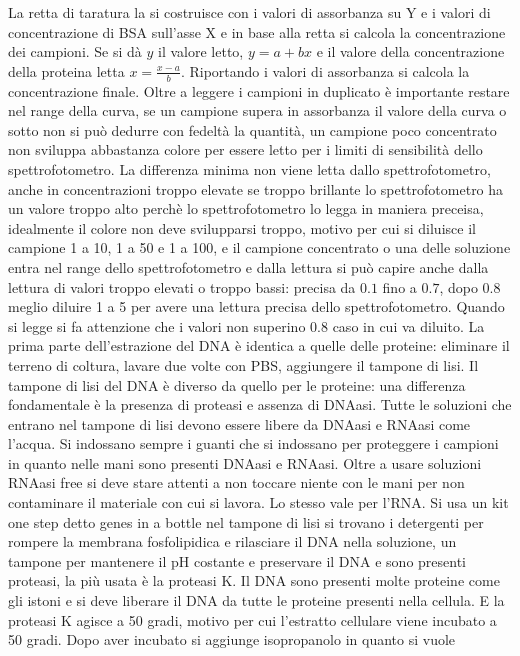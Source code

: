 La retta di taratura la si costruisce con i valori di assorbanza su Y e i valori di concentrazione di BSA sull'asse X e in base alla retta si calcola la concentrazione dei campioni. Se
si d\`a $y$ il valore letto, $y = a + bx$ e il valore della concentrazione della proteina letta $x = \frac{x-a}{b}$. Riportando i valori di assorbanza si calcola la concentrazione finale.
Oltre a leggere i campioni in duplicato \`e importante restare nel range della curva, se un campione supera in assorbanza il valore della curva o sotto non si pu\`o dedurre con 
fedelt\`a la quantit\`a, un campione poco concentrato non sviluppa abbastanza colore per essere letto per i limiti di sensibilit\`a dello spettrofotometro. La differenza minima non
viene letta dallo spettrofotometro, anche in concentrazioni troppo elevate se troppo brillante lo spettrofotometro ha un valore troppo alto perch\`e lo spettrofotometro lo legga in 
maniera preceisa, idealmente il colore non deve svilupparsi troppo, motivo per cui si diluisce il campione 1 a 10, 1 a 50 e 1 a 100, e il campione concentrato o una delle soluzione
entra nel range dello spettrofotometro e dalla lettura si pu\`o capire anche dalla lettura di valori troppo elevati o troppo bassi: precisa da $0.1$ fino a $0.7$, dopo $0.8$ meglio
diluire 1 a 5 per avere una lettura precisa dello spettrofotometro. Quando si legge si fa attenzione che i valori non superino $0.8$ caso in cui va diluito. 
La prima parte dell'estrazione del DNA \`e identica a quelle delle proteine: eliminare il terreno di coltura, lavare due volte con PBS, aggiungere il tampone di lisi. Il tampone di lisi
del DNA \`e diverso da quello per le proteine: una differenza fondamentale \`e la presenza di proteasi e assenza di DNAasi. Tutte le soluzioni che entrano nel tampone di lisi devono
essere libere da DNAasi e RNAasi come l'acqua. Si indossano sempre i guanti che si indossano per proteggere i campioni in quanto nelle mani sono presenti DNAasi e RNAasi. Oltre a usare
soluzioni RNAasi free si deve stare attenti a non toccare niente con le mani per non contaminare il materiale con cui si lavora. Lo stesso vale per l'RNA. Si usa un kit one step
detto genes in a bottle nel tampone di lisi si trovano i detergenti per rompere la membrana fosfolipidica e rilasciare il DNA nella soluzione, un tampone per mantenere il pH costante
e preservare il DNA e sono presenti proteasi, la pi\`u usata \`e la proteasi K. Il DNA sono presenti molte proteine come gli istoni e si deve liberare il DNA da tutte le proteine 
presenti nella cellula. E la proteasi K agisce a 50 gradi, motivo per cui l'estratto cellulare viene incubato a 50 gradi. Dopo aver incubato si aggiunge isopropanolo in quanto si vuole
